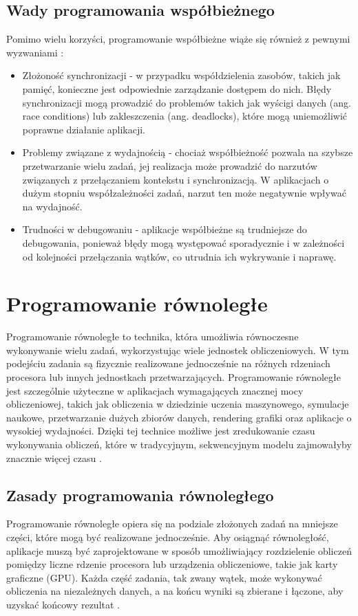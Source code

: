 \subsection{Wady programowania współbieżnego}
Pomimo wielu korzyści, programowanie współbieżne wiąże się również z pewnymi wyzwaniami \cite{ProsAndCons, HandsOnConcurrencywithRust}:
\begin{itemize}
    \item Złożoność synchronizacji - w przypadku współdzielenia zasobów, takich jak pamięć, konieczne jest odpowiednie zarządzanie dostępem do nich. Błędy synchronizacji mogą prowadzić do problemów takich jak wyścigi danych (ang. race conditions) lub zakleszczenia (ang. deadlocks), które mogą uniemożliwić poprawne działanie aplikacji.
    \item Problemy związane z wydajnością - chociaż współbieżność pozwala na szybsze przetwarzanie wielu zadań, jej realizacja może prowadzić do narzutów związanych z przełączaniem kontekstu i synchronizacją. W aplikacjach o dużym stopniu współzależności zadań, narzut ten może negatywnie wpływać na wydajność.
    \item Trudności w debugowaniu - aplikacje współbieżne są trudniejsze do debugowania, ponieważ błędy mogą występować sporadycznie i w zależności od kolejności przełączania wątków, co utrudnia ich wykrywanie i naprawę.
\end{itemize}

\section{Programowanie równoległe}

Programowanie równoległe to technika, która umożliwia równoczesne wykonywanie wielu zadań, wykorzystując wiele jednostek obliczeniowych. W tym podejściu zadania są fizycznie realizowane jednocześnie na różnych rdzeniach procesora lub innych jednostkach przetwarzających. Programowanie równoległe jest szczególnie użyteczne w aplikacjach wymagających znacznej mocy obliczeniowej, takich jak obliczenia w dziedzinie uczenia maszynowego, symulacje naukowe, przetwarzanie dużych zbiorów danych, rendering grafiki oraz aplikacje o wysokiej wydajności. Dzięki tej technice możliwe jest zredukowanie czasu wykonywania obliczeń, które w tradycyjnym, sekwencyjnym modelu zajmowałyby znacznie więcej czasu \cite {MasteringConcurrencyAndParallelProgramming,CUDA}.

\subsection{Zasady programowania równoległego}
Programowanie równoległe opiera się na podziale złożonych zadań na mniejsze części, które mogą być realizowane jednocześnie. Aby osiągnąć równoległość, aplikacje muszą być zaprojektowane w sposób umożliwiający rozdzielenie obliczeń pomiędzy liczne rdzenie procesora lub urządzenia obliczeniowe, takie jak karty graficzne (GPU). Każda część zadania, tak zwany wątek, może wykonywać obliczenia na niezależnych danych, a na końcu wyniki są zbierane i łączone, aby uzyskać końcowy rezultat \cite{CUDA}.

